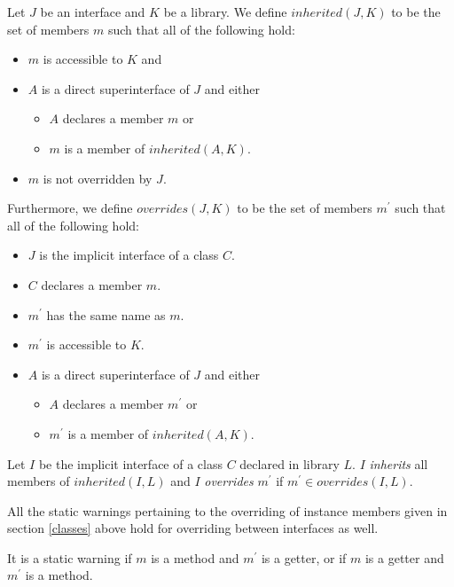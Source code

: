\documentclass{article}
\begin{document}
\LMHash{}
Let $J$ be an interface and $K$ be a library. We define $inherited(J, K)$  to be the set of members $m$ such that   all of the following hold:
\begin{itemize}
\item $m$ is accessible to $K$ and
\item $A$ is a direct superinterface of $J$ and either
  \begin{itemize}
  \item $A$ declares a member $m$  or
  \item $m$ is a member of $inherited(A, K)$.
  \end{itemize}
\item $m$ is not overridden by $J$.
\end{itemize}

\LMHash{}
Furthermore, we define $overrides(J, K)$  to be the set of members $m^\prime$ such that  all of the following hold:
\begin{itemize}
\item $J$ is the implicit interface of a class $C$.
\item  $C$ declares a member $m$.
\item $m^\prime$ has the same name as $m$.
\item $m^\prime$ is accessible to $K$.
\item $A$ is a direct superinterface of $J$ and either
  \begin{itemize}
  \item $A$ declares a member $m^\prime$ or
  \item $m^\prime$ is a member of $inherited(A, K)$.
  \end{itemize}
\end{itemize}


\LMHash{}
Let $I$ be the implicit interface of a class $C$ declared in library $L$.  $I$ {\em inherits} all members of $inherited(I, L)$ and $I$ {\em overrides} $m^\prime$ if  $m^\prime \in overrides(I, L)$.

\LMHash{}
All the static warnings pertaining to the overriding of instance members given in section \ref{classes} above hold for overriding between interfaces as well.

\LMHash{}
It is a static warning if $m$ is a method and $m^\prime$ is a getter, or if $m$ is a getter and $m^\prime$ is a method.



\end{document}
